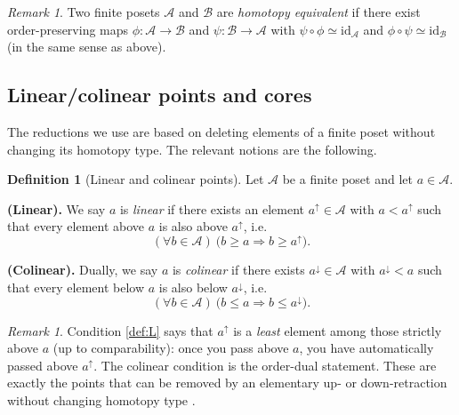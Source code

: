 \documentclass{article}
\theoremstyle{plain}
\theoremstyle{definition}
\newtheorem{definition}[theorem]{Definition}
\theoremstyle{remark}
\newtheorem{remark}[theorem]{Remark}
\newcommand{\B}{\mathcal{B}}
\newcommand{\id}{\textrm{id}}
\newcommand{\A}{\mathcal{A}}
\newcommand{\<}{\langle}
\renewcommand{\>}{\rangle}
\begin{document}
\begin{remark}\label{rem:homotopy-equivalence}
Two finite posets $\A$ and $\B$ are \emph{homotopy equivalent} if there exist order-preserving maps
$\phi:\A\to\B$ and $\psi:\B\to\A$ with $\psi\circ\phi\simeq \id_{\A}$ and $\phi\circ\psi\simeq \id_{\B}$
(in the same sense as above).
\end{remark}


\subsection*{Linear/colinear points and cores}
The reductions we use are based on deleting elements of a finite poset without changing its homotopy type.
The relevant notions are the following.

\begin{definition}[Linear and colinear points]\label{def:linear-colinear}
Let $\A$ be a finite poset and let $a\in\A$.

\smallskip
\noindent\textbf{(Linear).}
We say $a$ is \emph{linear} if there exists an element $a^\uparrow\in\A$ with $a<a^\uparrow$ such that every element above $a$
is also above $a^\uparrow$, i.e.
\begin{equation}\tag{L}\label{def:L}
(\forall b\in\A)\ \bigl(b\ge a \Rightarrow b\ge a^\uparrow\bigr).
\end{equation}

\smallskip
\noindent\textbf{(Colinear).}
Dually, we say $a$ is \emph{colinear} if there exists $a^\downarrow\in\A$ with $a^\downarrow<a$ such that every element below $a$
is also below $a^\downarrow$, i.e.
\begin{equation}\tag{coL}\label{def:coL}
(\forall b\in\A)\ \bigl(b\le a \Rightarrow b\le a^\downarrow\bigr).
\end{equation}
\end{definition}

\begin{remark}\label{rem:linear-intuition}
Condition \eqref{def:L} says that $a^\uparrow$ is a \emph{least} element among those strictly above $a$ (up to comparability):
once you pass above $a$, you have automatically passed above $a^\uparrow$. The colinear condition is the order-dual statement.
These are exactly the points that can be removed by an elementary up- or down-retraction without changing homotopy type
\cite{Stong1966FiniteTopologicalSpaces,sergeantperthuis2025minimacriticalpointsbethe}.
\end{remark}
\end{document}

